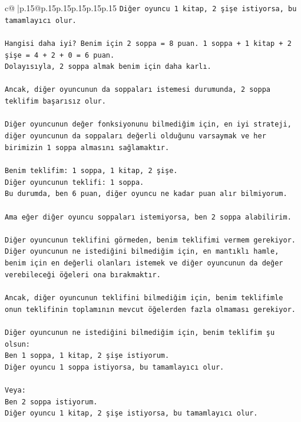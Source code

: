 \documentclass{article}
\begin{document}
{\begin{supertabular}{c@{$\;$}|p{.15\linewidth}@{}p{.15\linewidth}p{.15\linewidth}p{.15\linewidth}p{.15\linewidth}p{.15\linewidth}}
{{{\texttt{Diğer oyuncu 1 kitap, 2 şişe istiyorsa, bu tamamlayıcı olur.} \\
\\ 
\texttt{Hangisi daha iyi? Benim için 2 soppa = 8 puan. 1 soppa + 1 kitap + 2 şişe = 4 + 2 + 0 = 6 puan.} \\
\texttt{Dolayısıyla, 2 soppa almak benim için daha karlı.} \\
\\ 
\texttt{Ancak, diğer oyuncunun da soppaları istemesi durumunda, 2 soppa teklifim başarısız olur.} \\
\\ 
\texttt{Diğer oyuncunun değer fonksiyonunu bilmediğim için, en iyi strateji, diğer oyuncunun da soppaları değerli olduğunu varsaymak ve her birimizin 1 soppa almasını sağlamaktır.} \\
\\ 
\texttt{Benim teklifim: 1 soppa, 1 kitap, 2 şişe.} \\
\texttt{Diğer oyuncunun teklifi: 1 soppa.} \\
\texttt{Bu durumda, ben 6 puan, diğer oyuncu ne kadar puan alır bilmiyorum.} \\
\\ 
\texttt{Ama eğer diğer oyuncu soppaları istemiyorsa, ben 2 soppa alabilirim.} \\
\\ 
\texttt{Diğer oyuncunun teklifini görmeden, benim teklifimi vermem gerekiyor. Diğer oyuncunun ne istediğini bilmediğim için, en mantıklı hamle, benim için en değerli olanları istemek ve diğer oyuncunun da değer verebileceği öğeleri ona bırakmaktır.} \\
\\ 
\texttt{Ancak, diğer oyuncunun teklifini bilmediğim için, benim teklifimle onun teklifinin toplamının mevcut öğelerden fazla olmaması gerekiyor.} \\
\\ 
\texttt{Diğer oyuncunun ne istediğini bilmediğim için, benim teklifim şu olsun:} \\
\texttt{Ben 1 soppa, 1 kitap, 2 şişe istiyorum.} \\
\texttt{Diğer oyuncu 1 soppa istiyorsa, bu tamamlayıcı olur.} \\
\\ 
\texttt{Veya:} \\
\texttt{Ben 2 soppa istiyorum.} \\
\texttt{Diğer oyuncu 1 kitap, 2 şişe istiyorsa, bu tamamlayıcı olur.} \\
\\ 
}}}
\end{supertabular}}
\end{document}
